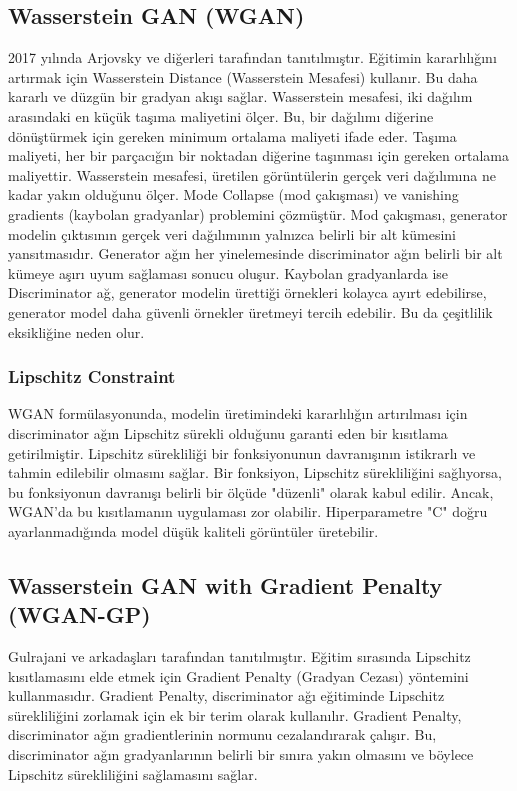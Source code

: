 \subsection{Wasserstein GAN (WGAN)}
2017 yılında Arjovsky ve diğerleri tarafından tanıtılmıştır. Eğitimin kararlılığını artırmak için Wasserstein Distance (Wasserstein Mesafesi) kullanır. Bu daha kararlı ve düzgün bir gradyan akışı sağlar.  Wasserstein mesafesi, iki dağılım arasındaki en küçük taşıma maliyetini ölçer. Bu, bir dağılımı diğerine dönüştürmek için gereken minimum ortalama maliyeti ifade eder. Taşıma maliyeti, her bir parçacığın bir noktadan diğerine taşınması için gereken ortalama maliyettir. Wasserstein mesafesi, üretilen görüntülerin gerçek veri dağılımına ne kadar yakın olduğunu ölçer. Mode Collapse (mod çakışması) ve vanishing gradients (kaybolan gradyanlar) problemini çözmüştür. Mod çakışması, generator modelin çıktısının gerçek veri dağılımının yalnızca belirli bir alt kümesini yansıtmasıdır. Generator ağın her yinelemesinde discriminator ağın belirli bir alt kümeye aşırı uyum sağlaması sonucu oluşur. Kaybolan gradyanlarda ise Discriminator ağ, generator modelin ürettiği örnekleri kolayca ayırt edebilirse, generator model daha güvenli örnekler üretmeyi tercih edebilir. Bu da çeşitlilik eksikliğine neden olur.

\subsubsection{Lipschitz Constraint}
WGAN formülasyonunda, modelin üretimindeki kararlılığın artırılması için discriminator ağın Lipschitz sürekli olduğunu garanti eden bir kısıtlama getirilmiştir. Lipschitz sürekliliği bir fonksiyonunun davranışının istikrarlı ve tahmin edilebilir olmasını sağlar. Bir fonksiyon, Lipschitz sürekliliğini sağlıyorsa, bu fonksiyonun davranışı belirli bir ölçüde "düzenli" olarak kabul edilir. Ancak, WGAN'da bu kısıtlamanın uygulaması zor olabilir. Hiperparametre "C" doğru ayarlanmadığında model düşük kaliteli görüntüler üretebilir.

\subsection{Wasserstein GAN with Gradient Penalty (WGAN-GP)}
Gulrajani ve arkadaşları tarafından tanıtılmıştır. Eğitim sırasında Lipschitz kısıtlamasını elde etmek için Gradient Penalty (Gradyan Cezası) yöntemini kullanmasıdır. Gradient Penalty, discriminator ağı eğitiminde Lipschitz sürekliliğini zorlamak için ek bir terim olarak kullanılır. Gradient Penalty, discriminator ağın gradientlerinin normunu cezalandırarak çalışır. Bu, discriminator ağın gradyanlarının belirli bir sınıra yakın olmasını ve böylece Lipschitz sürekliliğini sağlamasını sağlar.

